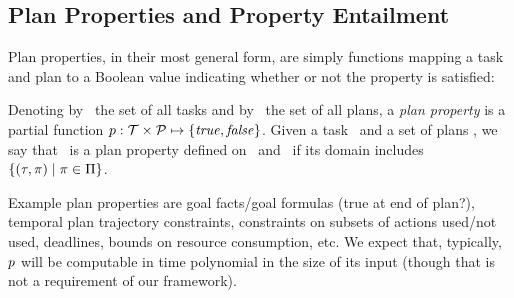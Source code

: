 \subsection{Plan Properties and Property Entailment}

Plan properties, in their most general form, are simply functions
mapping a task and plan to a Boolean value indicating whether or not
the property is satisfied:

\begin{definition}
Denoting by \alltasks\ the set of all tasks and by \allplans\ the set
of all plans, a \emph{plan property} is a partial function $p :
\cal T \times \cal P \mapsto \{\mathit{true}, \mathit{false}\}$. Given a task
\task\ and a set of plans \plans, we say that \prop\ is a plan
property defined on \task\ and \plans\ if its domain includes
$\{(\tau,\pi) \mid \pi \in \Pi\}$.
\end{definition}

Example plan properties are goal facts/goal formulas (true at end of
plan?), temporal plan trajectory constraints, constraints on subsets
of actions used/not used, deadlines, bounds on resource consumption,
etc. We expect that, typically, $p$ will be computable in time
polynomial in the size of its input (though that is not a requirement
of our framework).

